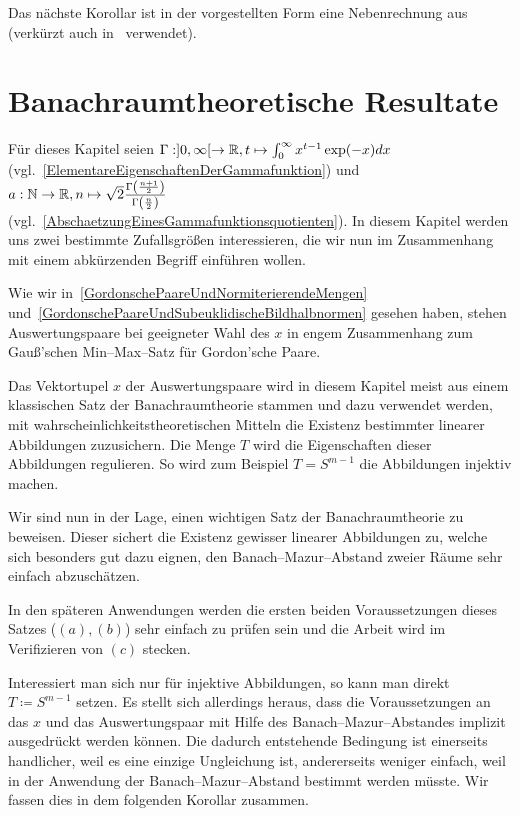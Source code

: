 \documentclass[a4paper]{report}
\numberwithin[\roman]{equation}{sat}
\begin{document}

Das nächste Korollar ist in der vorgestellten Form eine Nebenrechnung aus~\cite{Gor2} (verkürzt auch in~\cite{Gor} verwendet).



\chapter{Banachraumtheoretische Resultate}
\label{ch:kapitel4}

Für dieses Kapitel seien
$\Gamma: ]0, \infty[ \rightarrow \mathbb{R},t \mapsto \int_0^\infty x^{t-1}\exp(-x)dx$
(vgl.~\ref{ElementareEigenschaftenDerGammafunktion}) und
$a: \mathbb{N} \rightarrow \mathbb{R},
n\mapsto\sqrt 2\frac{\Gamma\left(\frac{n+1}2\right)}
                    {\Gamma\left(\frac n2 \right)}$
(vgl.~\ref{AbschaetzungEinesGammafunktionsquotienten}).\absatz
In diesem Kapitel werden uns zwei bestimmte Zufallsgrößen interessieren, die
wir nun im Zusammenhang mit einem abkürzenden Begriff einführen wollen.



Wie wir in~\ref{GordonschePaareUndNormiterierendeMengen} und~\ref{GordonschePaareUndSubeuklidischeBildhalbnormen} gesehen haben, stehen
Auswertungspaare bei geeigneter Wahl des $x$ in engem Zusammenhang zum
Gauß'schen Min--Max--Satz für Gordon'sche Paare.

Das Vektortupel $x$ der Auswertungspaare wird in diesem Kapitel meist aus einem
klassischen Satz der Banachraumtheorie stammen und dazu verwendet werden, mit
wahrscheinlichkeitstheoretischen Mitteln die Existenz bestimmter linearer
Abbildungen zuzusichern.
Die Menge $T$ wird die Eigenschaften dieser Abbildungen regulieren.
So wird zum Beispiel $T = S^{m-1}$ die Abbildungen injektiv machen.

Wir sind nun in der Lage, einen wichtigen Satz der Banachraumtheorie zu
beweisen.
Dieser sichert die Existenz gewisser linearer Abbildungen zu,
welche sich besonders gut dazu eignen, den Banach--Mazur--Abstand zweier
Räume sehr einfach abzuschätzen.


\parag
In den späteren Anwendungen werden die ersten beiden Voraussetzungen dieses
Satzes ($(a),(b)$) sehr einfach zu prüfen sein und die Arbeit wird im Verifizieren von $(c)$ stecken.

Interessiert man sich nur für injektive Abbildungen, so kann man direkt
$T \coloneqq  S^{m-1}$ setzen.
Es stellt sich allerdings heraus, dass die
Voraussetzungen an das $x$ und das Auswertungspaar mit Hilfe des
Banach--Mazur--Abstandes implizit ausgedrückt werden können.
Die dadurch entstehende Bedingung ist einerseits handlicher, weil es eine einzige
Ungleichung ist, andererseits weniger einfach, weil in der Anwendung der
Banach--Mazur--Abstand bestimmt werden müsste.
Wir fassen dies in dem folgenden Korollar zusammen.
\end{document}
